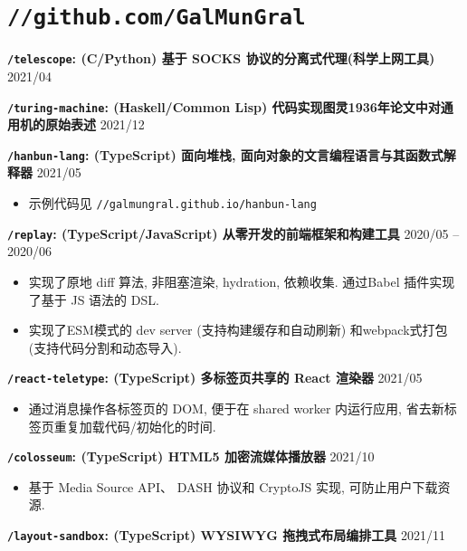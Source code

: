 \documentclass[10pt]{article}
\begin{document}
\section*{\texttt{\large //github.com/GalMunGral}}

\textbf{\texttt{/telescope}:  (C/Python) 基于 SOCKS 协议的分离式代理(科学上网工具)}   \hfill 2021/04

\vspace{0.5em}
\textbf{\texttt{/turing-machine}:  (Haskell/Common Lisp) 代码实现图灵1936年论文中对通用机的原始表述} \hfill 2021/12

\vspace{0.5em}
\textbf{\texttt{/hanbun-lang}: (TypeScript) 面向堆栈, 面向对象的文言编程语言与其函数式解释器} \hfill 2021/05
\begin{itemize}
\item 示例代码见 \texttt{//galmungral.github.io/hanbun-lang}
\end{itemize}

\vspace{0.5em}
\textbf{\texttt{/replay}: (TypeScript/JavaScript)  从零开发的前端框架和构建工具 } \hfill 2020/05 -- 2020/06
\begin{itemize}
\item 实现了原地 diff 算法, 非阻塞渲染, hydration, 依赖收集. 通过Babel 插件实现了基于 JS 语法的 DSL.
\item 实现了ESM模式的 dev server (支持构建缓存和自动刷新) 和webpack式打包 (支持代码分割和动态导入).
\end{itemize}

\vspace{0.5em}
\textbf{\texttt{/react-teletype}:  (TypeScript) 多标签页共享的 React 渲染器} \hfill 2021/05 
\begin{itemize}
\item  通过消息操作各标签页的 DOM, 便于在 shared worker 内运行应用, 省去新标签页重复加载代码/初始化的时间.
\end{itemize}

\vspace{0.5em}
\textbf{\texttt{/colosseum}:  (TypeScript) HTML5 加密流媒体播放器}   \hfill 2021/10
\begin{itemize}
\item 基于 Media Source API、 DASH 协议和 CryptoJS 实现, 可防止用户下载资源.
\end{itemize}

\vspace{0.5em}
\textbf{\texttt{/layout-sandbox}: (TypeScript) WYSIWYG 拖拽式布局编排工具} \hfill 2021/11
\end{document}

